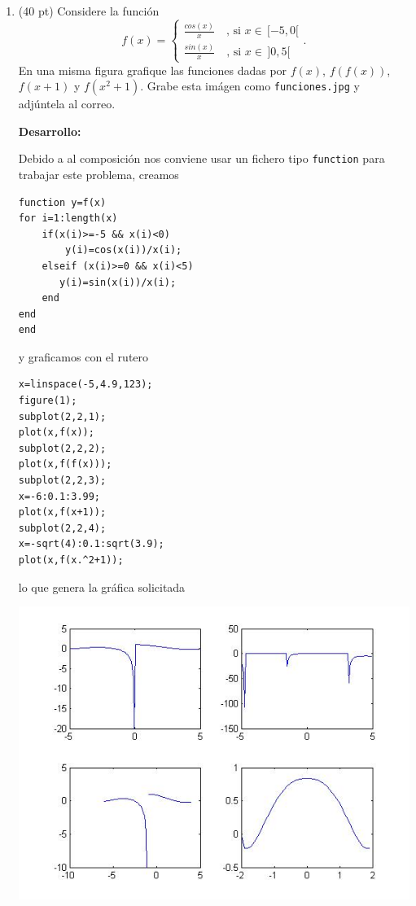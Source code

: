 \documentclass[11pt]{article}
\begin{document}
\begin{enumerate}
\begin{enumerate}
\end{enumerate}

\item (40 pt) Considere la funci\'on
$$
f(x)=
\begin{cases}
\frac{cos(x)}{x} \quad  \text{, si } x\in\,[-5,0[\\
\frac{sin(x)}{x} \quad  \text{, si } x\in\,]0,5[
\end{cases}.
$$
En una misma figura grafique las funciones dadas por $f(x)$, $f(f(x))$, $f(x+1)$ y $f(x^2+1)$. Grabe esta im\'agen como \texttt{funciones.jpg} y adj\'untela al correo.

\textbf{Desarrollo:}

Debido a al composici\'on nos conviene usar un fichero tipo \texttt{function} para trabajar este problema, creamos
\begin{lstlisting}
function y=f(x)
for i=1:length(x)
	if(x(i)>=-5 && x(i)<0)
    	y(i)=cos(x(i))/x(i);
    elseif (x(i)>=0 && x(i)<5)
       y(i)=sin(x(i))/x(i);
    end
end
end
\end{lstlisting}
y graficamos con el rutero
\begin{lstlisting}
x=linspace(-5,4.9,123);
figure(1);
subplot(2,2,1);
plot(x,f(x));
subplot(2,2,2);
plot(x,f(f(x)));
subplot(2,2,3);
x=-6:0.1:3.99;
plot(x,f(x+1));
subplot(2,2,4);
x=-sqrt(4):0.1:sqrt(3.9);
plot(x,f(x.^2+1));
\end{lstlisting}
lo que genera la gr\'afica solicitada

\includegraphics[width=\textwidth]{funciones.jpg}

\end{enumerate}
\end{document}
